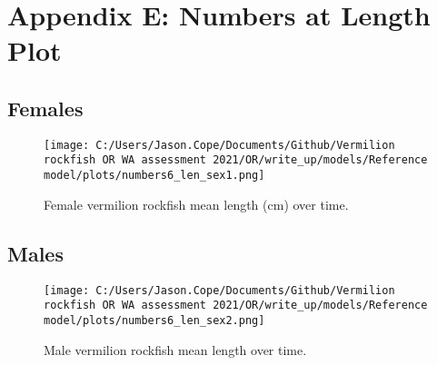 \documentclass[11pt,
  english,
  letterpaper,
]{article}
\begin{document}
\clearpage

\hypertarget{app-e}{%
\section{Appendix E: Numbers at Length Plot}\label{app-e}}

\hypertarget{females-1}{%
\subsection{Females}\label{females-1}}

\begin{figure}
\centering
\texttt{[image: C:/Users/Jason.Cope/Documents/Github/Vermilion rockfish OR WA assessment 2021/OR/write\_up/models/Reference model/plots/numbers6\_len\_sex1.png]}
\caption{Female vermilion rockfish mean length (cm) over time.\label{fig:num_lts_females}}
\end{figure}

\clearpage

\hypertarget{males-1}{%
\subsection{Males}\label{males-1}}

\begin{figure}
\centering
\texttt{[image: C:/Users/Jason.Cope/Documents/Github/Vermilion rockfish OR WA assessment 2021/OR/write\_up/models/Reference model/plots/numbers6\_len\_sex2.png]}
\caption{Male vermilion rockfish mean length over time.\label{fig:num_lts_males}}
\end{figure}

\clearpage
\end{document}
